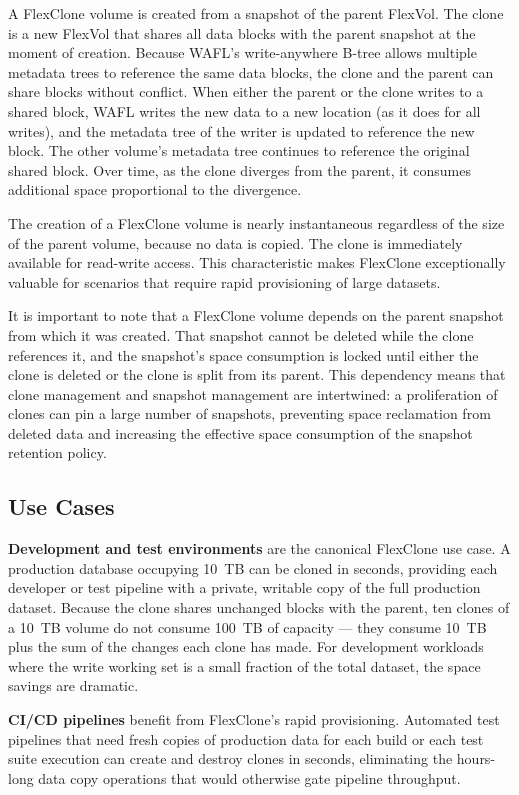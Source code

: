 A FlexClone volume is created from a snapshot of the parent FlexVol. The clone is a new FlexVol that shares all data blocks with the parent snapshot at the moment of creation. Because WAFL's write-anywhere B-tree allows multiple metadata trees to reference the same data blocks, the clone and the parent can share blocks without conflict. When either the parent or the clone writes to a shared block, WAFL writes the new data to a new location (as it does for all writes), and the metadata tree of the writer is updated to reference the new block. The other volume's metadata tree continues to reference the original shared block. Over time, as the clone diverges from the parent, it consumes additional space proportional to the divergence.

The creation of a FlexClone volume is nearly instantaneous regardless of the size of the parent volume, because no data is copied. The clone is immediately available for read-write access. This characteristic makes FlexClone exceptionally valuable for scenarios that require rapid provisioning of large datasets.

It is important to note that a FlexClone volume depends on the parent snapshot from which it was created. That snapshot cannot be deleted while the clone references it, and the snapshot's space consumption is locked until either the clone is deleted or the clone is split from its parent. This dependency means that clone management and snapshot management are intertwined: a proliferation of clones can pin a large number of snapshots, preventing space reclamation from deleted data and increasing the effective space consumption of the snapshot retention policy.

\subsection{Use Cases}

\textbf{Development and test environments} are the canonical FlexClone use case. A production database occupying 10~TB can be cloned in seconds, providing each developer or test pipeline with a private, writable copy of the full production dataset. Because the clone shares unchanged blocks with the parent, ten clones of a 10~TB volume do not consume 100~TB of capacity --- they consume 10~TB plus the sum of the changes each clone has made. For development workloads where the write working set is a small fraction of the total dataset, the space savings are dramatic.

\textbf{CI/CD pipelines} benefit from FlexClone's rapid provisioning. Automated test pipelines that need fresh copies of production data for each build or each test suite execution can create and destroy clones in seconds, eliminating the hours-long data copy operations that would otherwise gate pipeline throughput.

